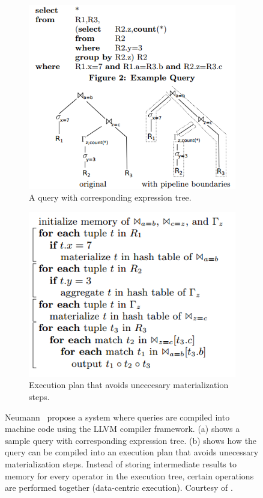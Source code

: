 \begin{figure}
  \centering
  \begin{subfigure}{0.45\textwidth}
    \includegraphics[width=\textwidth]{img/pipeline-boundary-1.png}
    \caption{A query with corresponding expression tree.}
    \label{fig:pipeline-boundary-1} 
  \end{subfigure}
  \begin{subfigure}{0.45\textwidth}
    \includegraphics[width=\textwidth]{img/pipeline-boundary-2.png}
    \caption{Execution plan that avoids uneccesary materialization steps.}
    \label{fig:pipeline-boundary-2} 
  \end{subfigure}
  \caption{Neumann \ea~propose a system where queries are compiled into machine code using the LLVM compiler framework. (a) shows a sample query with corresponding expression tree. (b) shows how the query can be compiled into an execution plan that avoids unecessary materialization steps. Instead of storing intermediate results to memory for every operator in the execution tree, certain operations are performed together (data-centric execution). Courtesy of \cite{Neumann2011-uq}.} 
  \label{fig:pipeline-boundary} 
\end{figure}

